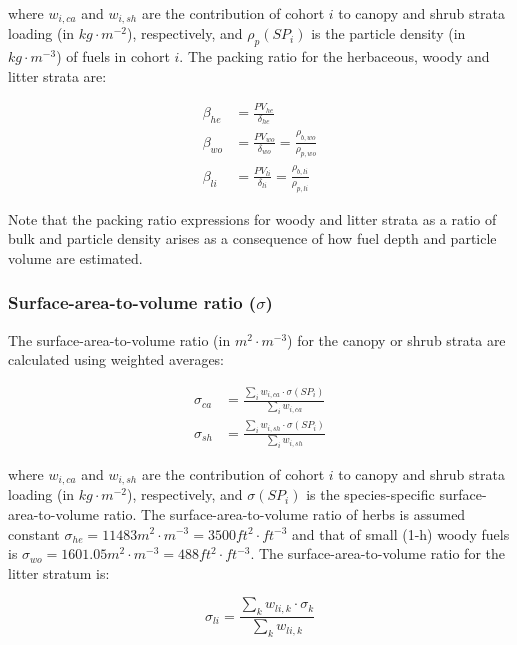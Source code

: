 \documentclass[]{book}
\begin{document}
where \(w_{i,ca}\) and \(w_{i,sh}\) are the contribution of cohort \(i\)
to canopy and shrub strata loading (in \(kg\cdot m^{-2}\)),
respectively, and \(\rho_p(SP_i)\) is the particle density (in
\(kg\cdot m^{-3}\)) of fuels in cohort \(i\). The packing ratio for the
herbaceous, woody and litter strata are:

\begin{eqnarray}
\beta _{he} &= \frac{PV_{he}}{\delta_{he}}\\
\beta _{wo} &= \frac{PV_{wo}}{\delta_{wo}}= \frac{\rho_{b,wo}}{\rho_{p,wo}}\\
\beta _{li} &= \frac{PV_{li}}{\delta_{li}}= \frac{\rho_{b,li}}{\rho_{p,li}}
\end{eqnarray}

Note that the packing ratio expressions for woody and litter strata as a
ratio of bulk and particle density arises as a consequence of how fuel
depth and particle volume are estimated.

\subsubsection{\texorpdfstring{Surface-area-to-volume ratio
(\(\sigma\))}{Surface-area-to-volume ratio (\textbackslash{}sigma)}}\label{surface-area-to-volume-ratio-sigma}

The surface-area-to-volume ratio (in \(m^2\cdot m^{-3}\)) for the canopy
or shrub strata are calculated using weighted averages:

\begin{eqnarray}
\sigma_{ca} &= \frac{\sum_{i}{w_{i,ca} \cdot \sigma(SP_i)}}{\sum_{i}{w_{i,ca}}}\\
\sigma_{sh} &= \frac{\sum_{i}{w_{i,sh} \cdot \sigma(SP_i)}}{\sum_{i}{w_{i,sh}}}
\end{eqnarray}

where \(w_{i,ca}\) and \(w_{i,sh}\) are the contribution of cohort \(i\)
to canopy and shrub strata loading (in \(kg\cdot m^{-2}\)),
respectively, and \(\sigma(SP_i)\) is the species-specific
surface-area-to-volume ratio. The surface-area-to-volume ratio of herbs
is assumed constant
\(\sigma_{he} = 11483 m^2\cdot m^{-3} = 3500 ft^2\cdot ft^{-3}\) and
that of small (1-h) woody fuels is
\(\sigma_{wo} = 1601.05 m^2\cdot m^{-3} = 488 ft^2\cdot ft^{-3}\). The
surface-area-to-volume ratio for the litter stratum is:

\begin{equation}
\sigma_{li} = \frac{\sum_{k}{w_{li,k} \cdot \sigma_{k}}}{\sum_{k}{w_{li,k}}}
\end{equation}
\end{document}
